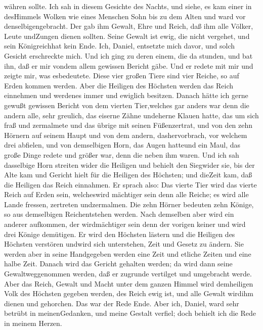 währen sollte.  Ich sah in diesem Gesichte des Nachts, und
siehe, es kam einer in desHimmels Wolken wie eines Menschen Sohn bis zu
dem Alten und ward vor denselbigengebracht.  Der gab ihm
Gewalt, Ehre und Reich, daß ihm alle Völker, Leute undZungen dienen
sollten. Seine Gewalt ist ewig, die nicht vergehet, und sein
Königreichhat kein Ende.  Ich, Daniel, entsetzte mich
davor, und solch Gesicht erschreckte mich.  Und ich ging zu
deren einem, die da stunden, und bat ihn, daß er mir vondem allem
gewissen Bericht gäbe. Und er redete mit mir und zeigte mir, was
esbedeutete.  Diese vier großen Tiere sind vier Reiche, so
auf Erden kommen werden.  Aber die Heiligen des Höchsten
werden das Reich einnehmen und werdenes immer und ewiglich besitzen.
 Danach hätte ich gerne gewußt gewissen Bericht von dem
vierten Tier,welches gar anders war denn die andern alle, sehr greulich,
das eiserne Zähne undeherne Klauen hatte, das um sich fraß und
zermalmete und das übrige mit seinen Füßenzertrat,  und von
den zehn Hörnern auf seinem Haupt und von dem andern, dashervorbrach,
vor welchem drei abfielen, und von demselbigen Horn, das Augen hatteund
ein Maul, das große Dinge redete und größer war, denn die neben ihm
waren.  Und ich sah dasselbige Horn streiten wider die
Heiligen und behielt den Siegwider sie,  bis der Alte kam
und Gericht hielt für die Heiligen des Höchsten; und dieZeit kam, daß
die Heiligen das Reich einnahmen.  Er sprach also: Das
vierte Tier wird das vierte Reich auf Erden sein, welcheswird mächtiger
sein denn alle Reiche; es wird alle Lande fressen, zertreten
undzermalmen.  Die zehn Hörner bedeuten zehn Könige, so aus
demselbigen Reichentstehen werden. Nach demselben aber wird ein anderer
aufkommen, der wirdmächtiger sein denn der vorigen keiner und wird drei
Könige demütigen.  Er wird den Höchsten lästern und die
Heiligen des Höchsten verstören undwird sich unterstehen, Zeit und
Gesetz zu ändern. Sie werden aber in seine Handgegeben werden eine Zeit
und etliche Zeiten und eine halbe Zeit.  Danach wird das
Gericht gehalten werden; da wird dann seine Gewaltweggenommen werden,
daß er zugrunde vertilget und umgebracht werde.  Aber das
Reich, Gewalt und Macht unter dem ganzen Himmel wird demheiligen Volk
des Höchsten gegeben werden, des Reich ewig ist, und alle Gewalt wirdihm
dienen und gehorchen.  Das war der Rede Ende. Aber ich,
Daniel, ward sehr betrübt in meinenGedanken, und meine Gestalt verfiel;
doch behielt ich die Rede in meinem Herzen.

